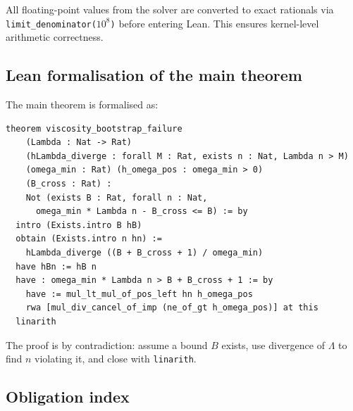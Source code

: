 \documentclass[11pt,a4paper]{article}
\theoremstyle{definition}
\begin{document}
All floating-point values from the solver are converted to exact
rationals via \texttt{limit\_denominator($10^8$)} before entering
Lean.  This ensures kernel-level arithmetic correctness.

\subsection{Lean formalisation of the main theorem}

The main theorem is formalised as:

\begin{lstlisting}[caption={OBL-10: Viscosity bootstrap failure (Lean~4)}]
theorem viscosity_bootstrap_failure
    (Lambda : Nat -> Rat)
    (hLambda_diverge : forall M : Rat, exists n : Nat, Lambda n > M)
    (omega_min : Rat) (h_omega_pos : omega_min > 0)
    (B_cross : Rat) :
    Not (exists B : Rat, forall n : Nat,
      omega_min * Lambda n - B_cross <= B) := by
  intro (Exists.intro B hB)
  obtain (Exists.intro n hn) :=
    hLambda_diverge ((B + B_cross + 1) / omega_min)
  have hBn := hB n
  have : omega_min * Lambda n > B + B_cross + 1 := by
    have := mul_lt_mul_of_pos_left hn h_omega_pos
    rwa [mul_div_cancel_of_imp (ne_of_gt h_omega_pos)] at this
  linarith
\end{lstlisting}

The proof is by contradiction: assume a bound $B$ exists, use
divergence of $\Lambda$ to find $n$ violating it, and close with
\texttt{linarith}.

\subsection{Obligation index}
\end{document}
